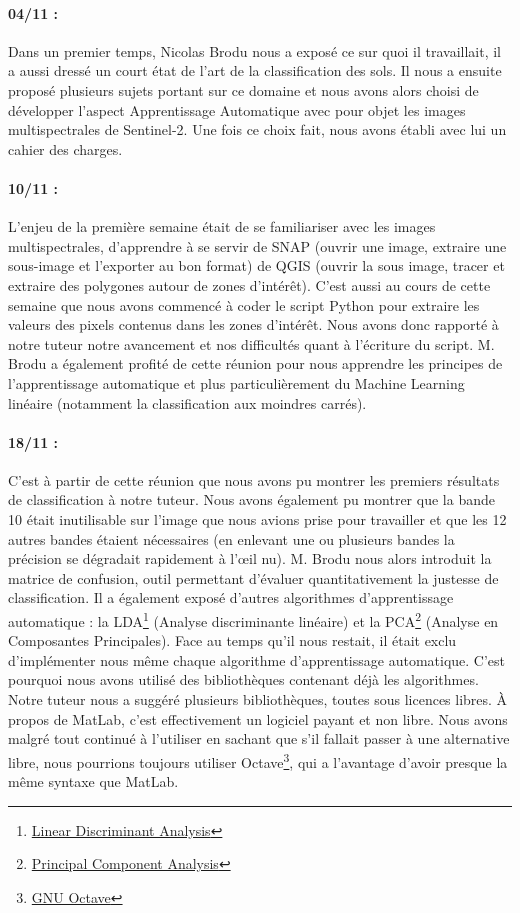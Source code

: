 \documentclass[a4paper,10pt]{article}
\begin{document}
\paragraph{04/11 :} Dans un premier temps, Nicolas Brodu nous a exposé ce sur quoi il travaillait, il a aussi dressé un court état de l'art de la classification des sols. Il nous a ensuite proposé plusieurs sujets portant sur ce domaine et nous avons alors choisi de développer l'aspect Apprentissage Automatique avec pour objet les images multispectrales de Sentinel-2. Une fois ce choix fait, nous avons établi avec lui un cahier des charges.
\paragraph{10/11 :} L'enjeu de la première semaine était de se familiariser avec les images multispectrales, d'apprendre à se servir de SNAP (ouvrir une image, extraire une sous-image et l'exporter au bon format) de QGIS (ouvrir la sous image, tracer et extraire des polygones autour de zones d'intérêt). C'est aussi au cours de cette semaine que nous avons commencé à coder le script Python pour extraire les valeurs des pixels contenus dans les zones d'intérêt. Nous avons donc rapporté à notre tuteur notre avancement et nos difficultés quant à l'écriture du script. M. Brodu a également profité de cette réunion pour nous apprendre les principes de l'apprentissage automatique et plus particulièrement du  Machine Learning  linéaire (notamment la classification aux moindres carrés).
\paragraph{18/11 :} C'est à partir de cette réunion que nous avons pu montrer les premiers résultats de classification à notre tuteur. Nous avons également pu montrer que la bande 10 était inutilisable sur l'image que nous avions prise pour travailler et que les 12 autres bandes étaient nécessaires (en enlevant une ou plusieurs bandes la précision se dégradait rapidement à l'œil nu). M. Brodu nous alors introduit la matrice de confusion, outil permettant d'évaluer quantitativement la justesse de classification. Il a également exposé d'autres algorithmes d'apprentissage automatique : la LDA\footnote{\href{https://en.wikipedia.org/wiki/Linear_discriminant_analysis}{Linear Discriminant Analysis}} (Analyse discriminante linéaire) et la PCA\footnote{\href{https://en.wikipedia.org/wiki/Principal_component_analysis}{Principal Component Analysis}} (Analyse en Composantes Principales). Face au temps qu'il nous restait, il était exclu d'implémenter nous même chaque algorithme d'apprentissage automatique. C'est pourquoi nous avons utilisé des bibliothèques contenant déjà les algorithmes. Notre tuteur nous a suggéré plusieurs bibliothèques, toutes sous licences libres. À propos de MatLab, c'est effectivement un logiciel payant et non libre. Nous avons malgré tout continué à l'utiliser en sachant que s'il fallait passer à une alternative libre, nous pourrions toujours utiliser Octave\footnote{\href{https://www.gnu.org/software/octave/}{GNU Octave}}, qui a l'avantage d'avoir presque la même syntaxe que MatLab.
\end{document}
